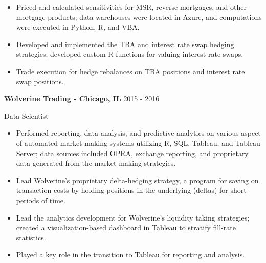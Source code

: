 \documentclass[11pt,a4paper,]{awesome-cv}
\begin{document}
\begin{itemize}
\item
  Priced and calculated sensitivities for MSR, reverse mortgages, and
  other mortgage products; data warehouses were located in Azure, and
  computations were executed in Python, R, and VBA. \vspace{-0.5ex}
\item
  Developed and implemented the TBA and interest rate swap hedging
  strategies; developed custom R functions for valuing interest rate
  swaps. \vspace{-0.5ex}
\item
  Trade execution for hedge rebalances on TBA positions and interest
  rate swap positions. \vspace{-0.5ex}
\end{itemize}

\normalsize

\textbf{Wolverine Trading - Chicago, IL} \hfill 2015 - 2016

\vspace{-1ex}

Data Scientist

\vspace{-1.5ex}

\small

\begin{itemize}
\item
  Performed reporting, data analysis, and predictive analytics on
  various aspect of automated market-making systems utilizing R, SQL,
  Tableau, and Tableau Server; data sources included OPRA, exchange
  reporting, and proprietary data generated from the market-making
  strategies. \vspace{-0.5ex}
\item
  Lead Wolverine's proprietary delta-hedging strategy, a program for
  saving on transaction costs by holding positions in the underlying
  (deltas) for short periods of time. \vspace{-0.5ex}
\item
  Lead the analytics development for Wolverine's liquidity taking
  strategies; created a visualization-based dashboard in Tableau to
  stratify fill-rate statistics. \vspace{-0.5ex}
\item
  Played a key role in the transition to Tableau for reporting and
  analysis. \vspace{-0.5ex}
\end{itemize}
\end{document}
